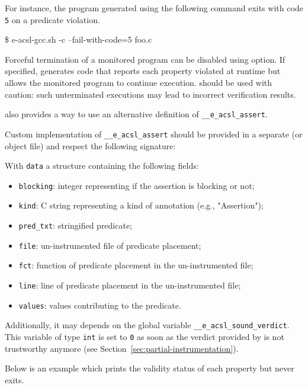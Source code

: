 For instance, the program generated using the following command
exits with code \texttt{5} on a predicate violation.
\begin{logs}
\$ e-acsl-gcc.sh -c --fail-with-code=5 foo.c
\end{logs}

Forceful termination of a monitored program can be disabled using
 option. If specified, \eacslgcc generates code that
reports each property violated at runtime but allows the monitored program to
continue execution.  should be used with caution:
such unterminated executions may lead to incorrect verification results.

\eacslgcc also provides a way to use an alternative definition of
\texttt{\_\_e\_acsl\_assert}.

Custom implementation of \texttt{\_\_e\_acsl\_assert}
should be provided in a separate \C (or object file) and respect the
following signature:


With \texttt{data} a structure containing the following fields:
\begin{itemize}
  \item \texttt{blocking}: integer representing if the assertion is blocking or
        not;
  \item \texttt{kind}: C string representing a kind of annotation (e.g.,
        "Assertion");
  \item \texttt{pred\_txt}: stringified predicate;
  \item \texttt{file}: un-instrumented file of predicate placement;
  \item \texttt{fct}: function of predicate placement in the un-instrumented
        file;
  \item \texttt{line}: line of predicate placement in the un-instrumented file;
  \item \texttt{values}: values contributing to the predicate.
\end{itemize}

Additionally, it may depends on the global variable
\texttt{\_\_e\_acsl\_sound\_verdict}. This
variable of type \texttt{int} is set to \texttt{0} as soon as the verdict
provided by \eacsl is not trustworthy anymore (see
Section~\ref{sec:partial-instrumentation}).

Below is an example which prints the validity status of each property but never
exits.

